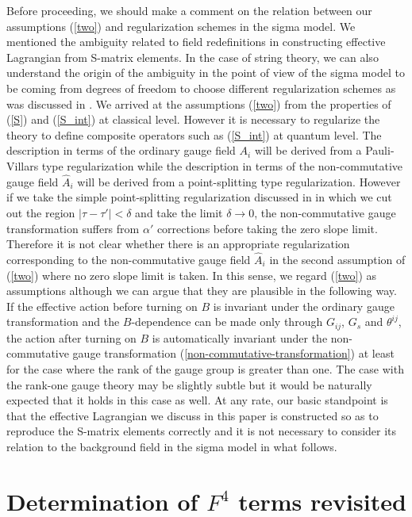 \documentclass[a4paper,12pt]{article}
\begin{document}
Before proceeding,
we should make a comment on the relation between
our assumptions (\ref{two}) and regularization schemes
in the sigma model.
We mentioned the ambiguity related to field redefinitions
in constructing effective Lagrangian from S-matrix elements.
In the case of string theory,
we can also understand the origin of the ambiguity
in the point of view of the sigma model
to be coming from degrees of freedom to choose
different regularization schemes
as was discussed in \cite{SW}.
We arrived at the assumptions (\ref{two}) from the properties
of (\ref{S}) and (\ref{S_int}) at classical level.
However it is necessary to regularize the theory
to define composite operators
such as (\ref{S_int}) at quantum level.
The description in terms of the ordinary gauge field $A_i$
will be derived from a Pauli-Villars type regularization
while the description in terms of the non-commutative gauge
field $\hat{A}_i$ will be derived from a point-splitting type
regularization.
However if we take the simple point-splitting regularization
discussed in \cite{SW}
in which we cut out the region $| \tau - \tau' | < \delta$
and take the limit $\delta \to 0$,
the non-commutative gauge transformation suffers from
$\alpha'$ corrections before taking the zero slope limit.
Therefore it is not clear whether there is
an appropriate regularization corresponding
to the non-commutative gauge field $\hat{A}_i$
in the second assumption of (\ref{two})
where no zero slope limit is taken.
In this sense, we regard (\ref{two}) as assumptions
although we can argue that they are plausible
in the following way.
If the effective action before turning on $B$
is invariant under the ordinary gauge transformation
and the $B$-dependence can be made only through
$G_{ij}$, $G_s$ and $\theta^{ij}$,
the action after turning on $B$ is automatically invariant
under the non-commutative gauge transformation
(\ref{non-commutative-transformation})
at least for the case where
the rank of the gauge group is greater than one.
The case with the rank-one gauge theory may be slightly subtle
but it would be naturally expected that
it holds in this case as well.
At any rate, our basic standpoint is that
the effective Lagrangian we discuss in this paper is
constructed so as to reproduce the S-matrix elements correctly
and it is not necessary to consider its relation
to the background field in the sigma model in what follows.

\section{Determination of $F^4$ terms revisited}
\setcounter{equation}{0}
\end{document}
